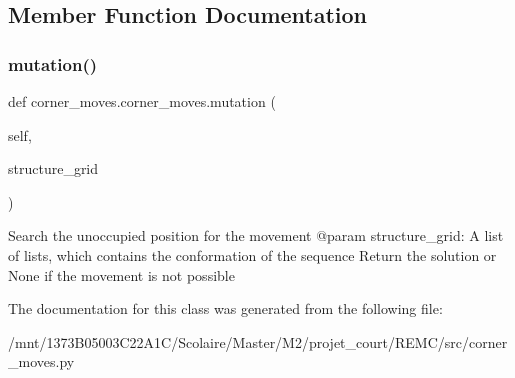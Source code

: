 \subsection{Member Function Documentation}
\mbox{\label{classcorner__moves_1_1corner__moves_ab52986603fbba7dfcf7d7a824fee483e}} 
\subsubsection{\texorpdfstring{mutation()}{mutation()}}
{\footnotesize\ttfamily def corner\+\_\+moves.\+corner\+\_\+moves.\+mutation (\begin{DoxyParamCaption}\item[{}]{self,  }\item[{}]{structure\+\_\+grid }\end{DoxyParamCaption})}

\begin{DoxyVerb}Search the unoccupied position for the movement
    @param structure_grid: A list of lists, which contains the
                    conformation of the sequence
    Return the solution or None if the movement is not possible
\end{DoxyVerb}
 

The documentation for this class was generated from the following file\+:\begin{DoxyCompactItemize}
\item 
/mnt/1373\+B05003\+C22\+A1\+C/\+Scolaire/\+Master/\+M2/projet\+\_\+court/\+R\+E\+M\+C/src/corner\+\_\+moves.\+py\end{DoxyCompactItemize}
